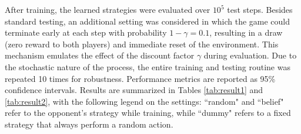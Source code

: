 \documentclass[twocolumn, 9pt]{extarticle}
\begin{document}
After training, the learned strategies were evaluated over $10^5$ test steps. Besides standard testing, an additional setting was considered in which the game could terminate early 
at each step with probability $1 - \gamma = 0.1$, resulting in a draw (zero reward to both players) and immediate reset of
 the environment. This mechanism emulates the effect of the discount factor $\gamma$ during evaluation. Due to the 
 stochastic nature of the process, the entire training and testing routine was repeated 10 times for robustness.
 Performance metrics are reported as 95\% confidence intervals. Results are summarized in Tables \ref{tab:result1} and \ref{tab:result2}, with the following legend on the settings:
 ``random" and ``belief" refer to the opponent's strategy while training, while ``dummy" refers to a fixed strategy that always perform a random action.
\begin{table}[h!]
    \centering
        \caption{Results without early termination}
        \label{tab:result1}
\end{table}

\begin{table}[h!]
    \centering
        \caption{Results with early termination}
        \label{tab:result2}
\end{table}
\end{document}
